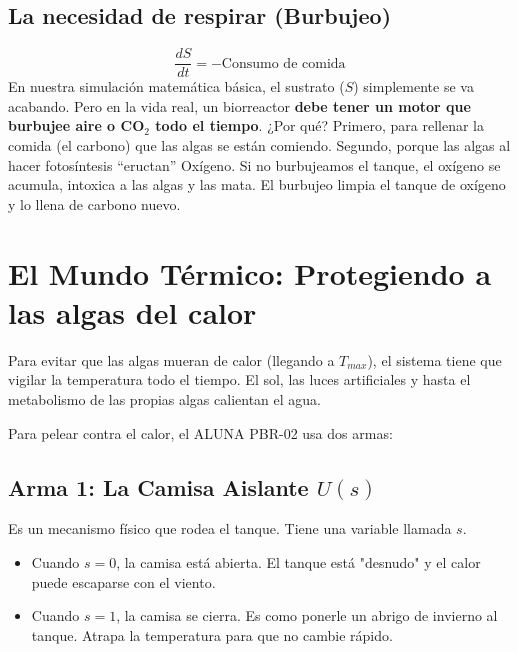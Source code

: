 \documentclass[11pt,a4paper]{article}
\begin{document}
\subsection{La necesidad de respirar (Burbujeo)}
\begin{equation}
\frac{dS}{dt} = - \text{Consumo de comida}
\end{equation}
En nuestra simulación matemática básica, el sustrato ($S$) simplemente se va acabando. Pero en la vida real, un biorreactor \textbf{debe tener un motor que burbujee aire o CO$_2$ todo el tiempo}. ¿Por qué? Primero, para rellenar la comida (el carbono) que las algas se están comiendo. Segundo, porque las algas al hacer fotosíntesis ``eructan'' Oxígeno. Si no burbujeamos el tanque, el oxígeno se acumula, intoxica a las algas y las mata. El burbujeo limpia el tanque de oxígeno y lo llena de carbono nuevo.

\section{El Mundo Térmico: Protegiendo a las algas del calor}
Para evitar que las algas mueran de calor (llegando a $T_{max}$), el sistema tiene que vigilar la temperatura todo el tiempo. El sol, las luces artificiales y hasta el metabolismo de las propias algas calientan el agua.

Para pelear contra el calor, el ALUNA PBR-02 usa dos armas:
\subsection{Arma 1: La Camisa Aislante $U(s)$}
Es un mecanismo físico que rodea el tanque. Tiene una variable llamada $s$.
\begin{itemize}
    \item Cuando \textbf{$s = 0$}, la camisa está abierta. El tanque está "desnudo" y el calor puede escaparse con el viento.
    \item Cuando \textbf{$s = 1$}, la camisa se cierra. Es como ponerle un abrigo de invierno al tanque. Atrapa la temperatura para que no cambie rápido.
\end{itemize}
\end{document}
